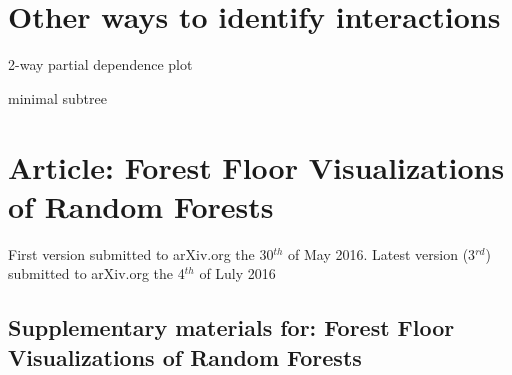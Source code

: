 \section{Other ways to identify interactions}

2-way partial dependence plot

minimal subtree \cite{ishwaran2010high}



\section{Article: Forest Floor Visualizations of Random Forests}

First version submitted to arXiv.org the 30$^{th}$ of May 2016.
Latest version (3$^{rd}$) submitted to arXiv.org the 4$^{th}$ of Luly 2016

\newpage


\subsection{Supplementary materials for: Forest Floor Visualizations of Random Forests}
\label{forestFloorSuppl}
